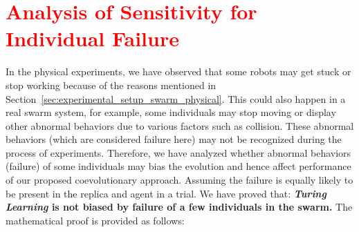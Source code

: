 \section{\textcolor{red}{Analysis of Sensitivity for Individual Failure}}\label{sec:analysis_algorithm}

In the physical experiments, we have observed that some robots may get stuck or stop working because of the reasons mentioned in Section~\ref{sec:experimental_setup_swarm_physical}. This could also happen in a real swarm system, for example, some individuals may stop moving or display other abnormal behaviors due to various factors such as collision. These abnormal behaviors (which are considered failure here) may not be recognized during the process of experiments. Therefore, we have analyzed whether abnormal behaviors (failure) of some individuals may bias the evolution and hence affect performance of our proposed coevolutionary approach. Assuming the failure is equally likely to be present in the replica and agent in a trial. We have proved that: \textbf{\textit{Turing Learning} is not biased by failure of a few individuals in the swarm.} The mathematical proof is provided as follows:
 
